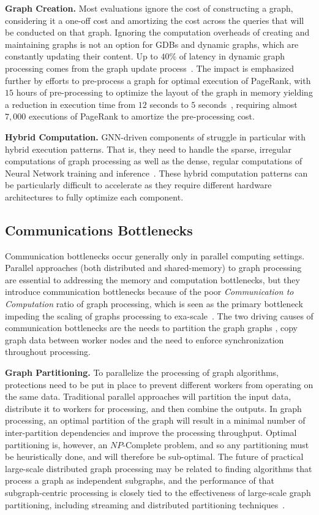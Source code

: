 \textbf{Graph Creation.}
Most \gai evaluations ignore the cost of constructing a graph, considering it a one-off cost and amortizing the cost across the queries that will be conducted on that graph. 
Ignoring the computation overheads of creating and maintaining graphs is not an option for GDBs and dynamic graphs, which are constantly updating their content.
Up to $40\%$ of latency in dynamic graph processing comes from the graph update process~\cite{Basak2020}. 
The impact is emphasized further by efforts to pre-process a graph for optimal execution of PageRank, with $15$ hours of pre-processing to optimize the layout of the graph in memory yielding a reduction in execution time from $12$ seconds to $5$ seconds~\cite{Balaji2018}, requiring almost $7,000$ executions of PageRank to amortize the pre-processing cost. 

\textbf{Hybrid Computation.}
GNN-driven components of \gai struggle in particular with hybrid execution patterns. 
That is, they need to handle the sparse, irregular computations of graph processing as well as the dense, regular computations of Neural Network training and inference~\cite{Yan2020}.
These hybrid computation patterns can be particularly difficult to accelerate as they require different hardware architectures to fully optimize each component. 

\subsection{Communications Bottlenecks}
Communication bottlenecks occur generally only in parallel computing settings.
Parallel approaches (both distributed and shared-memory) to graph processing are essential to addressing the memory and computation bottlenecks, but they introduce communication bottlenecks because of the poor \textit{Communication to Computation} ratio of graph processing, which is seen as the primary bottleneck impeding the scaling of graphs processing to exa-scale~\cite{Azad2021}.
The two driving causes of communication bottlenecks are the needs to partition the graph graphs , copy graph data between worker nodes and the need to enforce synchronization throughout processing.

\textbf{Graph Partitioning.}
To parallelize the processing of graph algorithms, protections need to be put in place to prevent different workers from operating on the same data. 
Traditional parallel approaches will partition the input data, distribute it to workers for processing, and then combine the outputs. 
In graph processing, an optimal partition of the graph will result in a minimal number of inter-partition dependencies and improve the processing throughput. 
Optimal partitioning is, however, an $NP$-Complete problem, and so any partitioning must be heuristically done, and will therefore be sub-optimal. 
The future of practical large-scale distributed graph processing may be related to finding algorithms that process a graph as independent subgraphs, and the performance of that subgraph-centric processing is closely tied to the effectiveness of large-scale graph partitioning, including streaming and distributed partitioning techniques~\cite{Mccune2015}.

